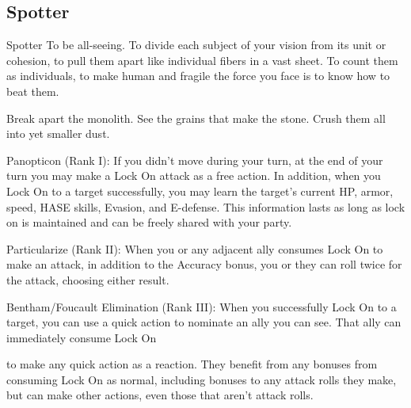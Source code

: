 \subsection{Spotter}

                                                      Spotter  
To be all-seeing. To divide each subject of your vision from its unit or cohesion, to pull them apart  
like individual fibers in a vast sheet. To count them as individuals, to make human and fragile the  
force you face is to know how to beat them.   

Break apart the monolith. See the grains that make the stone. Crush them all into yet smaller  
dust.  
 
 
Panopticon (Rank I): If you didn’t move during your turn, at the end of your turn you may make  
a Lock On attack as a free action. In addition, when you Lock On to a target successfully, you  
may learn the target’s current HP, armor, speed, HASE skills, Evasion, and E-defense. This  
information lasts as long as lock on is maintained and can be freely shared with your party.
 
Particularize (Rank II): When you or any adjacent ally consumes Lock On to make an attack, in  
addition to the Accuracy bonus, you or they can roll twice for the attack, choosing either result.
 
Bentham/Foucault Elimination (Rank III): When you successfully Lock On to a target, you can  
use a quick action to nominate an ally you can see. That ally can immediately consume Lock On  

                                                                                                                    


to make any quick action as a reaction. They benefit from any bonuses from consuming Lock On  
as normal, including bonuses to any attack rolls they make, but can make other actions, even  
those that aren’t attack rolls.